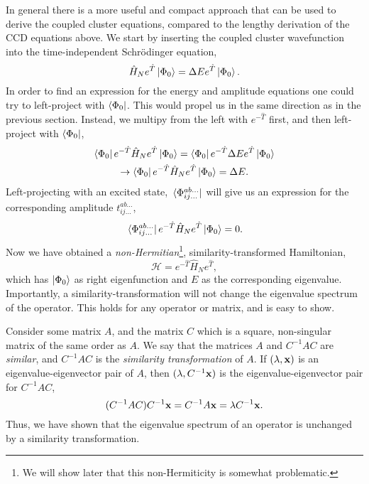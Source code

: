 In general there is a more useful and compact approach that can be used to derive 
the coupled cluster equations, compared to the lengthy derivation of the CCD 
equations above. We start by inserting the coupled cluster wavefunction into the 
time-independent Schrödinger equation,
\begin{equation}
    \hat{H}_Ne^{\hat{T}}\ket{\Phi_0} = \Delta E e^{\hat{T}}\ket{\Phi_0}.
\end{equation} 
In order to find an expression for the energy and amplitude equations one could 
try to left-project with $\bra{\Phi_0}$. This would propel us in the same 
direction as in the previous section. Instead, we multipy 
from the left with $e^{-\hat{T}}$ first, and then left-project with $\bra{\Phi_0}$,
\begin{equation}
    \label{eq:cc_energy}
    \begin{gathered}
    \bra{\Phi_0} e^{-\hat{T}}\hat{H}_Ne^{\hat{T}} \ket{\Phi_0} 
    = \bra{\Phi_0} e^{-\hat{T}} \Delta E e^{\hat{T}} \ket{\Phi_0} \\
    \to \bra{\Phi_0} e^{-\hat{T}} \hat{H}_N e^{\hat{T}} \ket{\Phi_0}
    = \Delta E.
    \end{gathered}
\end{equation}
Left-projecting with an excited state, $\bra*{\Phi^{ab\dots}_{ij\dots}}$ will give us 
an expression for the corresponding amplitude $t^{ab\dots}_{ij\dots}$,
\begin{equation}
    \label{eq:cc_amplitude}
    \bra*{\Phi^{ab\dots}_{ij\dots}} e^{-\hat{T}}\hat{H}_Ne^{\hat{T}}\ket{\Phi_0} = 0.
\end{equation}
Now we have obtained a \emph{non-Hermitian}\footnote{We will show later that this 
non-Hermiticity is somewhat problematic.}, similarity-transformed Hamiltonian,
\begin{equation}
    \mathscr{H} = e^{-\hat{T}}\hat{H}_Ne^{\hat{T}},
\end{equation}
which has $\ket{\Phi_0}$ as right eigenfunction and $E$ as the corresponding eigenvalue.
Importantly, a similarity-transformation will not change the eigenvalue spectrum of the 
operator. This holds for any operator or matrix, and is easy to show.

Consider some matrix $A$, and the matrix $C$ which is a square, non-singular 
matrix of the same order as $A$. We say that the matrices $A$ and
$C^{-1}AC$ are \emph{similar}, and $C^{-1}AC$ is the \emph{similarity transformation}
of $A$. If $(\lambda, \vb{x})$ is an
eigenvalue-eigenvector pair of $A$, then $(\lambda, C^{-1}\vb{x})$ is the 
eigenvalue-eigenvector pair for $C^{-1}AC$,
\begin{equation}
    (C^{-1}AC)C^{-1}\vb{x} = C^{-1}A\vb{x} = \lambda C^{-1}\vb{x}.
\end{equation}
Thus, we have shown that the eigenvalue spectrum of an operator is unchanged by a 
similarity transformation.


